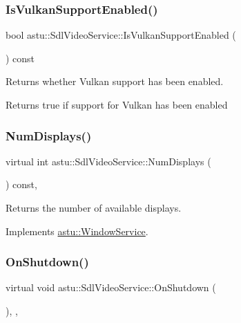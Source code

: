 \subsubsection{\texorpdfstring{Is\+Vulkan\+Support\+Enabled()}{IsVulkanSupportEnabled()}}
{\footnotesize\ttfamily bool astu\+::\+Sdl\+Video\+Service\+::\+Is\+Vulkan\+Support\+Enabled (\begin{DoxyParamCaption}{ }\end{DoxyParamCaption}) const}

Returns whether Vulkan support has been enabled.

\begin{DoxyReturn}{Returns}
{\ttfamily true} if support for Vulkan has been enabled 
\end{DoxyReturn}
\mbox{\label{classastu_1_1SdlVideoService_a3aefc8ab3780a23cdef8780e42436fd5}} 
\subsubsection{\texorpdfstring{Num\+Displays()}{NumDisplays()}}
{\footnotesize\ttfamily virtual int astu\+::\+Sdl\+Video\+Service\+::\+Num\+Displays (\begin{DoxyParamCaption}{ }\end{DoxyParamCaption}) const\hspace{0.3cm}{\ttfamily [override]}, {\ttfamily [virtual]}}

Returns the number of available displays. 

Implements \hyperlink{classastu_1_1WindowService_ad773e0c567946e06ace76c016bb16349}{astu\+::\+Window\+Service}.

\mbox{\label{classastu_1_1SdlVideoService_a6d6085e9ff213c5d41546d604ff53e92}} 
\subsubsection{\texorpdfstring{On\+Shutdown()}{OnShutdown()}}
{\footnotesize\ttfamily virtual void astu\+::\+Sdl\+Video\+Service\+::\+On\+Shutdown (\begin{DoxyParamCaption}{ }\end{DoxyParamCaption})\hspace{0.3cm}{\ttfamily [override]}, {\ttfamily [protected]}, {\ttfamily [virtual]}}

